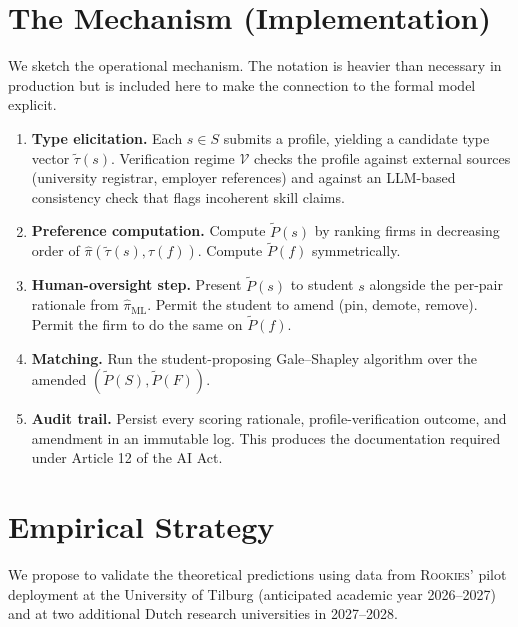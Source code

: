 \documentclass[11pt,a4paper]{article}
\begin{document}
\section{The Mechanism (Implementation)}
\label{sec:mech}

We sketch the operational mechanism. The notation is heavier than necessary in production but is included here to make the connection to the formal model explicit.

\begin{enumerate}[leftmargin=2em,itemsep=2pt,topsep=4pt]
    \item \textbf{Type elicitation.} Each $s \in S$ submits a profile, yielding a candidate type vector $\widetilde{\tau}(s)$. Verification regime $\mathcal{V}$ checks the profile against external sources (university registrar, employer references) and against an LLM-based consistency check that flags incoherent skill claims.
    \item \textbf{Preference computation.} Compute $\widetilde{P}(s)$ by ranking firms in decreasing order of $\widehat{\pi}(\widetilde{\tau}(s),\tau(f))$. Compute $\widetilde{P}(f)$ symmetrically.
    \item \textbf{Human-oversight step.} Present $\widetilde{P}(s)$ to student $s$ alongside the per-pair rationale from $\widehat{\pi}_{\mathrm{ML}}$. Permit the student to amend (pin, demote, remove). Permit the firm to do the same on $\widetilde{P}(f)$.
    \item \textbf{Matching.} Run the student-proposing Gale--Shapley algorithm over the amended $(\widetilde{P}(S),\widetilde{P}(F))$.
    \item \textbf{Audit trail.} Persist every scoring rationale, profile-verification outcome, and amendment in an immutable log. This produces the documentation required under Article 12 of the AI Act.
\end{enumerate}

\section{Empirical Strategy}
\label{sec:empirical}

We propose to validate the theoretical predictions using data from \textsc{Rookies}' pilot deployment at the University of Tilburg (anticipated academic year 2026--2027) and at two additional Dutch research universities in 2027--2028.
\end{document}
